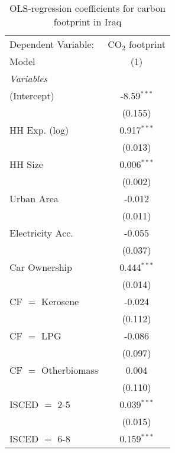 
\begin{table}[htbp!]
   \centering
   \small
   \begin{adjustbox}{width = 1\textwidth, max height = 0.95\textheight, center}
      \begin{threeparttable}[b]
         \caption{\label{tab:OLS_2_IRQ} OLS-regression coefficients for carbon footprint in Iraq}
         \begin{tabular}{lc}
            \tabularnewline \midrule \midrule
            Dependent Variable: & CO$_{2}$ footprint\\  
            Model               & (1)\\  
            \midrule
            \emph{Variables}\\
            (Intercept)         & -8.59$^{***}$\\   
                                & (0.155)\\   
            HH Exp. (log)       & 0.917$^{***}$\\   
                                & (0.013)\\   
            HH Size             & 0.006$^{***}$\\   
                                & (0.002)\\   
            Urban Area          & -0.012\\   
                                & (0.011)\\   
            Electricity Acc.    & -0.055\\   
                                & (0.037)\\   
            Car Ownership       & 0.444$^{***}$\\   
                                & (0.014)\\   
            CF $=$ Kerosene     & -0.024\\   
                                & (0.112)\\   
            CF $=$ LPG          & -0.086\\   
                                & (0.097)\\   
            CF $=$ Otherbiomass & 0.004\\   
                                & (0.110)\\   
            ISCED $=$ 2-5       & 0.039$^{***}$\\   
                                & (0.015)\\   
            ISCED $=$ 6-8       & 0.159$^{***}$\\   

\end{tabular}
\end{threeparttable}
\end{adjustbox}
\end{table}
